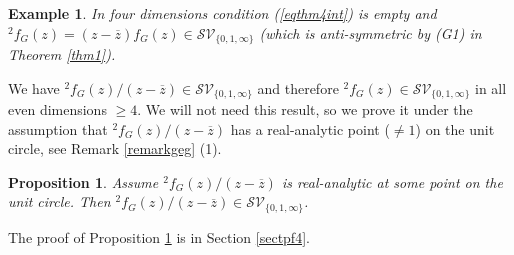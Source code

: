 \documentclass[oneside]{amsart}
\newcommand{\zz}{{\overline{z}}}
\newcommand{\sS}{\mathcal{S}}
\newcommand{\sV}{\mathcal{V}}
\theoremstyle{plain}
\newtheorem{prop}[thm]{Proposition}
\newtheorem{ex}[thm]{Example}
\begin{document}
\begin{ex}
In four dimensions condition (\ref{eqthm4int}) is empty and ${}^2\!f_G(z)=(z-\zz)f_G(z)\in\sS\sV_{\{0,1,\infty\}}$ (which is anti-symmetric by (G1) in Theorem \ref{thm1}).
\end{ex}

We have ${}^2\!f_G(z)/(z-\zz)\in\sS\sV_{\{0,1,\infty\}}$ and therefore ${}^2\!f_G(z)\in\sS\sV_{\{0,1,\infty\}}$ in all even dimensions $\geq4$.
We will not need this result, so we prove it under the assumption that ${}^2\!f_G(z)/(z-\zz)$ has a real-analytic point ($\neq1$) on the unit circle, see Remark \ref{remarkgeg} (1).

\begin{prop}\label{propgeg}
Assume ${}^2\!f_G(z)/(z-\zz)$ is real-analytic at some point on the unit circle. Then ${}^2\!f_G(z)/(z-\zz)\in\sS\sV_{\{0,1,\infty\}}$.
\end{prop}
The proof of Proposition \ref{propgeg} is in Section \ref{sectpf4}.
\end{document}
